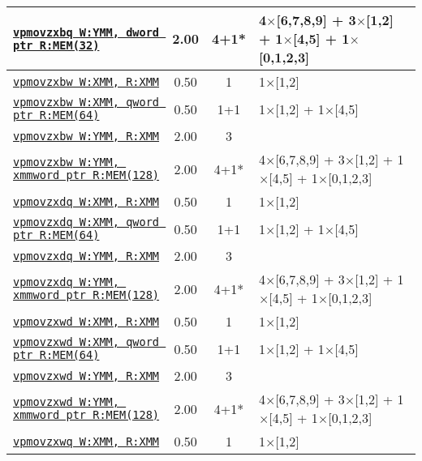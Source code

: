 \documentclass[a4paper,english,fontsize=9]{scrartcl}
\begin{document}
\begin{longtable}{p{}ccL{.25\textwidth}}
  \midrule
  \texttt{\href{https://felixcloutier.com/x86/PMOVZX.html}{vpmovzxbq W:YMM, dword ptr R:MEM(32)}} & 2.00 & 4+1* & 4\(\times\)[6,7,8,9] + 3\(\times\)[1,2] + 1\(\times\)[4,5] + 1\(\times\)[0,1,2,3] \\
  \midrule
  \texttt{\href{https://felixcloutier.com/x86/PMOVZX.html}{vpmovzxbw W:XMM, R:XMM}} & 0.50 & 1 & 1\(\times\)[1,2] \\
  \midrule
  \texttt{\href{https://felixcloutier.com/x86/PMOVZX.html}{vpmovzxbw W:XMM, qword ptr R:MEM(64)}} & 0.50 & 1+1 & 1\(\times\)[1,2] + 1\(\times\)[4,5] \\
  \midrule
  \texttt{\href{https://felixcloutier.com/x86/PMOVZX.html}{vpmovzxbw W:YMM, R:XMM}} & 2.00 & 3 &  \\
  \midrule
  \texttt{\href{https://felixcloutier.com/x86/PMOVZX.html}{vpmovzxbw W:YMM, xmmword ptr R:MEM(128)}} & 2.00 & 4+1* & 4\(\times\)[6,7,8,9] + 3\(\times\)[1,2] + 1\(\times\)[4,5] + 1\(\times\)[0,1,2,3] \\
  \midrule
  \texttt{\href{https://felixcloutier.com/x86/PMOVZX.html}{vpmovzxdq W:XMM, R:XMM}} & 0.50 & 1 & 1\(\times\)[1,2] \\
  \midrule
  \texttt{\href{https://felixcloutier.com/x86/PMOVZX.html}{vpmovzxdq W:XMM, qword ptr R:MEM(64)}} & 0.50 & 1+1 & 1\(\times\)[1,2] + 1\(\times\)[4,5] \\
  \midrule
  \texttt{\href{https://felixcloutier.com/x86/PMOVZX.html}{vpmovzxdq W:YMM, R:XMM}} & 2.00 & 3 &  \\
  \midrule
  \texttt{\href{https://felixcloutier.com/x86/PMOVZX.html}{vpmovzxdq W:YMM, xmmword ptr R:MEM(128)}} & 2.00 & 4+1* & 4\(\times\)[6,7,8,9] + 3\(\times\)[1,2] + 1\(\times\)[4,5] + 1\(\times\)[0,1,2,3] \\
  \midrule
  \texttt{\href{https://felixcloutier.com/x86/PMOVZX.html}{vpmovzxwd W:XMM, R:XMM}} & 0.50 & 1 & 1\(\times\)[1,2] \\
  \midrule
  \texttt{\href{https://felixcloutier.com/x86/PMOVZX.html}{vpmovzxwd W:XMM, qword ptr R:MEM(64)}} & 0.50 & 1+1 & 1\(\times\)[1,2] + 1\(\times\)[4,5] \\
  \midrule
  \texttt{\href{https://felixcloutier.com/x86/PMOVZX.html}{vpmovzxwd W:YMM, R:XMM}} & 2.00 & 3 &  \\
  \midrule
  \texttt{\href{https://felixcloutier.com/x86/PMOVZX.html}{vpmovzxwd W:YMM, xmmword ptr R:MEM(128)}} & 2.00 & 4+1* & 4\(\times\)[6,7,8,9] + 3\(\times\)[1,2] + 1\(\times\)[4,5] + 1\(\times\)[0,1,2,3] \\
  \midrule
  \texttt{\href{https://felixcloutier.com/x86/PMOVZX.html}{vpmovzxwq W:XMM, R:XMM}} & 0.50 & 1 & 1\(\times\)[1,2] \\

\end{longtable}
\end{document}
